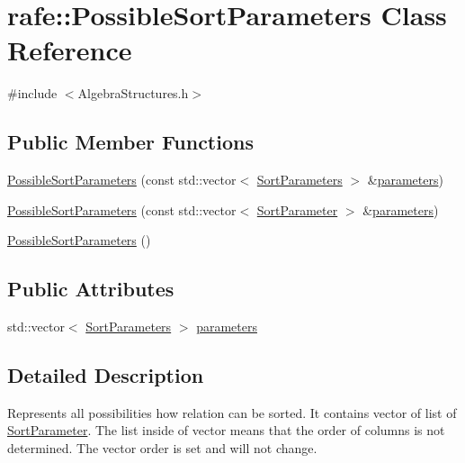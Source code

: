 \hypertarget{classrafe_1_1_possible_sort_parameters}{\section{rafe\+:\+:Possible\+Sort\+Parameters Class Reference}
\label{classrafe_1_1_possible_sort_parameters}
}


{\ttfamily \#include $<$Algebra\+Structures.\+h$>$}

\subsection*{Public Member Functions}
\begin{DoxyCompactItemize}
\item 
\hyperlink{classrafe_1_1_possible_sort_parameters_a33ff31d2f08d8e0026efd87ecaf7e99a}{Possible\+Sort\+Parameters} (const std\+::vector$<$ \hyperlink{classrafe_1_1_sort_parameters}{Sort\+Parameters} $>$ \&\hyperlink{classrafe_1_1_possible_sort_parameters_ace90bc0923cc964b0206542af29a49dc}{parameters})
\item 
\hyperlink{classrafe_1_1_possible_sort_parameters_aa87b5fb0147ef2826671787b28405124}{Possible\+Sort\+Parameters} (const std\+::vector$<$ \hyperlink{classrafe_1_1_sort_parameter}{Sort\+Parameter} $>$ \&\hyperlink{classrafe_1_1_possible_sort_parameters_ace90bc0923cc964b0206542af29a49dc}{parameters})
\item 
\hyperlink{classrafe_1_1_possible_sort_parameters_a082dfcff272f9831451905fcaf3be90e}{Possible\+Sort\+Parameters} ()
\end{DoxyCompactItemize}
\subsection*{Public Attributes}
\begin{DoxyCompactItemize}
\item 
std\+::vector$<$ \hyperlink{classrafe_1_1_sort_parameters}{Sort\+Parameters} $>$ \hyperlink{classrafe_1_1_possible_sort_parameters_ace90bc0923cc964b0206542af29a49dc}{parameters}
\end{DoxyCompactItemize}


\subsection{Detailed Description}
Represents all possibilities how relation can be sorted. It contains vector of list of \hyperlink{classrafe_1_1_sort_parameter}{Sort\+Parameter}. The list inside of vector means that the order of columns is not determined. The vector order is set and will not change. 

